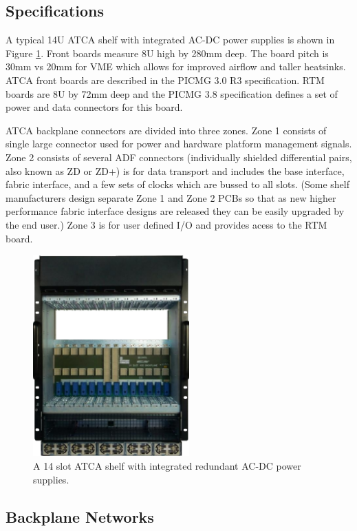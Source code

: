 \documentclass[letterpaper]{article}
\begin{document}
\subsection{Specifications}

A typical 14U ATCA shelf with integrated AC-DC power supplies is shown in Figure \ref{shelf}.  Front boards measure 8U high by 280mm deep.  The board pitch is 30mm vs 20mm for VME which allows for improved airflow and taller heatsinks.  ATCA front boards are described in the PICMG 3.0 R3 specification\cite{picmg30}.  RTM boards are 8U by 72mm deep and the PICMG 3.8 specification\cite{picmg38} defines a set of power and data connectors for this board.

ATCA backplane connectors are divided into three zones.  Zone 1 consists of single large connector used for power and hardware platform management signals.  Zone 2 consists of several ADF connectors (individually shielded differential pairs, also known as ZD or ZD+) is for data transport and includes the base interface, fabric interface, and a few sets of clocks which are bussed to all slots.  (Some shelf manufacturers design separate Zone 1 and Zone 2 PCBs so that as new higher performance fabric interface designs are released they can be easily upgraded by the end user.)  Zone 3 is for user defined I/O and provides acess to the RTM board.

\begin{figure}
\centering
\includegraphics[width=6cm]{shelf.png}
\caption{A 14 slot ATCA shelf with integrated redundant AC-DC power supplies.}
\label{shelf}
\end{figure}

\subsection{Backplane Networks}
\end{document}
